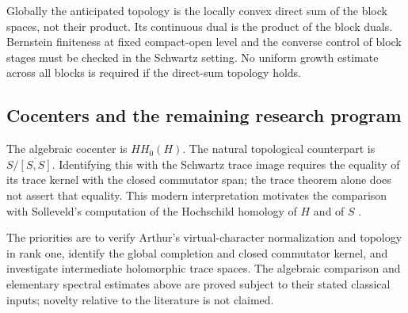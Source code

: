 Globally the anticipated topology is the locally convex direct sum of the block spaces, not their product. Its continuous dual is the product of the block duals. Bernstein finiteness at fixed compact-open level and the converse control of block stages must be checked in the Schwartz setting. No uniform growth estimate across all blocks is required if the direct-sum topology holds.

\subsection{Cocenters and the remaining research program}
The algebraic cocenter is $HH_0(H)$. The natural topological counterpart is $S/\overline{[S,S]}$. Identifying this with the Schwartz trace image requires the equality of its trace kernel with the closed commutator span; the trace theorem alone does not assert that equality. This modern interpretation motivates the comparison with Solleveld's computation of the Hochschild homology of $H$ and of $S$ \cite{So24}.
\begin{center}
\end{center}
The priorities are to verify Arthur's virtual-character normalization and topology in rank one, identify the global completion and closed commutator kernel, and investigate intermediate holomorphic trace spaces. The algebraic comparison and elementary spectral estimates above are proved subject to their stated classical inputs; novelty relative to the literature is not claimed.
